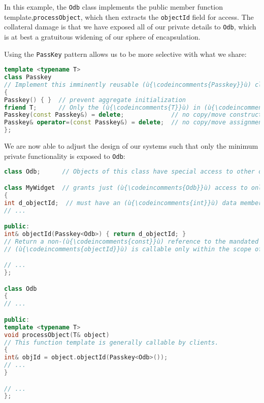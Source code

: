 \noindent In this example, the \texttt{Odb} class implements the public member
function template,\linebreak[4] \texttt{processObject}, which then extracts the
\texttt{objectId} field for access. The collateral damage is that we
have exposed all of our private details to \texttt{Odb}, which is at
best a gratuitous widening of our sphere of encapsulation.

Using the \texttt{PassKey} pattern allows us to be more selective with
what we share:

\begin{lstlisting}[language=C++]
template <typename T>
class Passkey
// Implement this imminently reusable (ù{\codeincomments{Passkey}}ù) class template again here.
{
Passkey() { }  // prevent aggregate initialization
friend T;      // Only the (ù{\codeincomments{T}}ù) in (ù{\codeincomments{PassKey<T>}}ù) can create a (ù{\codeincomments{PassKey}}ù) object.
Passkey(const Passkey&) = delete;             // no copy/move construction
Passkey& operator=(const Passkey&) = delete;  // no copy/move assignment
};
\end{lstlisting}

\noindent We are now able to adjust the design of our systems such that only the
minimum private functionality is exposed to \texttt{Odb}:

\begin{lstlisting}[language=C++]
class Odb;      // Objects of this class have special access to other objects.

class MyWidget  // grants just (ù{\codeincomments{Odb}}ù) access to only its (ù{\codeincomments{objectId}}ù) member function
{
int d_objectId;  // must have an (ù{\codeincomments{int}}ù) data member of any name we choose
// ...

public:
int& objectId(Passkey<Odb>) { return d_objectId; }
// Return a non-(ù{\codeincomments{const}}ù) reference to the mandated (ù{\codeincomments{int}}ù) data member.
// (ù{\codeincomments{objectId}}ù) is callable only within the scope of (ù{\codeincomments{Odb}}ù).

// ...
};

class Odb
{
// ...

public:
template <typename T>
void processObject(T& object)
// This function template is generally callable by clients.
{
int& objId = object.objectId(Passkey<Odb>());
// ...
}

// ...
};
\end{lstlisting}

